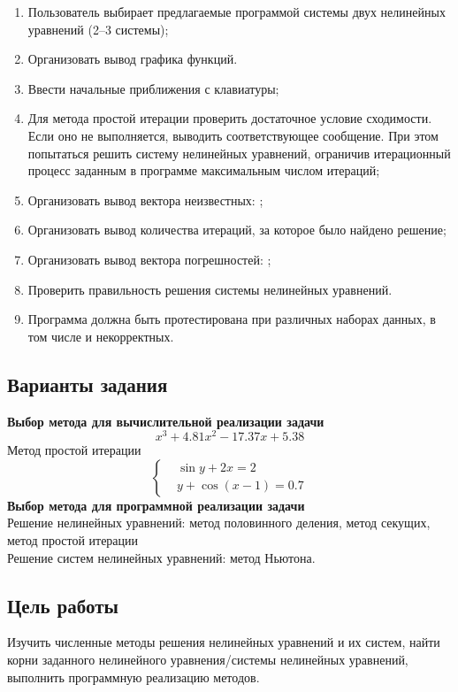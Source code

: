\documentclass{article}
\begin{document}
\begin{enumerate}
      \item Пользователь выбирает предлагаемые программой системы двух нелинейных уравнений (2–3 системы);
      \item Организовать вывод графика функций.
      \item Ввести начальные приближения с клавиатуры;
      \item Для метода простой итерации проверить достаточное условие сходимости. Если оно не выполняется, выводить соответствующее сообщение. При этом попытаться решить систему нелинейных уравнений, ограничив итерационный процесс заданным в программе максимальным числом итераций;
      \item Организовать вывод вектора неизвестных: ;
      \item Организовать вывод количества итераций, за которое было найдено решение;
      \item Организовать вывод вектора погрешностей: ;
      \item Проверить правильность решения системы нелинейных уравнений.
      \item Программа должна быть протестирована при различных наборах данных, в том числе и некорректных.
\end{enumerate}

\subsection{Варианты задания}
\textbf{Выбор метода для вычислительной реализации задачи}
      \\
      $$x^3+4.81x^2-17.37x+5.38$$
      Метод простой итерации
      \\
      $$\begin{cases}
            &\sin y + 2x=2\\
            &y+\cos(x-1)=0.7
      \end{cases}$$
      \textbf{Выбор метода для программной реализации задачи}
      \\
      Решение нелинейных уравнений: метод половинного деления, метод секущих, метод простой итерации
      \\
      Решение систем нелинейных уравнений: метод Ньютона.
\subsection{Цель работы}
      Изучить численные методы решения нелинейных уравнений и их систем, найти корни заданного нелинейного уравнения/системы нелинейных уравнений, выполнить программную реализацию методов.
\end{document}
